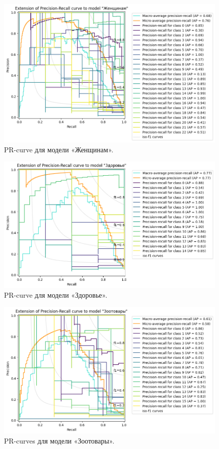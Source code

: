 \documentclass[a4paper,12pt]{extarticle}
\begin{document}
\begin{figure}[hbtp]
	\centering
	\includegraphics[scale=0.7]{pr_curves/prcurve_Женщинам.png}
	\caption{PR-curve для модели «Женщинам».}
	\label{fig:prcurve_Женщинам}
\end{figure}

\begin{figure}[hbtp]
	\centering
	\includegraphics[scale=0.7]{pr_curves/prcurve_Здоровье.png}
	\caption{PR-curve для модели «Здоровье».}
	\label{fig:prcurve_Здоровье}
\end{figure}

\begin{figure}[hbtp]
	\centering
	\includegraphics[scale=0.7]{pr_curves/prcurve_Зоотовары.png}
	\caption{PR-curves для модели «Зоотовары».}
	\label{fig:prcurve_Зоотовары}
\end{figure}
\end{document}

